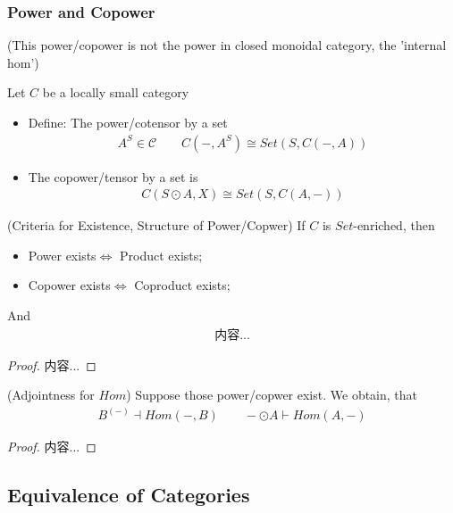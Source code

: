 \documentclass[Total.tex]{subfiles}
\begin{document}
				\subsubsection{Power and Copower}
					(This power/copower is not the power in closed monoidal category, the 'internal hom')
					\begin{Def} Let $C$ be a locally small category
						\begin{itemize}
							\item Define: The power/cotensor by a set
							\begin{gather*}
								A^S\in \mathcal{C}\qquad C(-,A^S)\cong Set(S,C(-,A))
							\end{gather*}
							\item The copower/tensor by a set is 
							\begin{gather*}
								C(S\odot A,X)\cong Set(S,C(A,-))
							\end{gather*}
						\end{itemize}
					\end{Def}
					
					\begin{proposition}
						(Criteria for Existence, Structure of Power/Copwer) If $C$ is $Set$-enriched, then
						\begin{itemize}
							\item Power exists$\Leftrightarrow$ Product exists;
							\item Copower exists$\Leftrightarrow$ Coproduct exists;
						\end{itemize}
						
						And
						\begin{gather*}
							内容...
						\end{gather*}
					\end{proposition}
					\begin{proof}
						内容...
					\end{proof}
					
					\begin{proposition}
						(Adjointness for $Hom$) Suppose those power/copwer exist. We obtain, that
						\begin{gather*}
							B^{(-)}\dashv Hom(-,B)\qquad -\odot A\vdash Hom(A,-)
						\end{gather*}
					\end{proposition}
					\begin{proof}
						内容...
					\end{proof}
			\subsection{Equivalence of  Categories}
\end{document}

